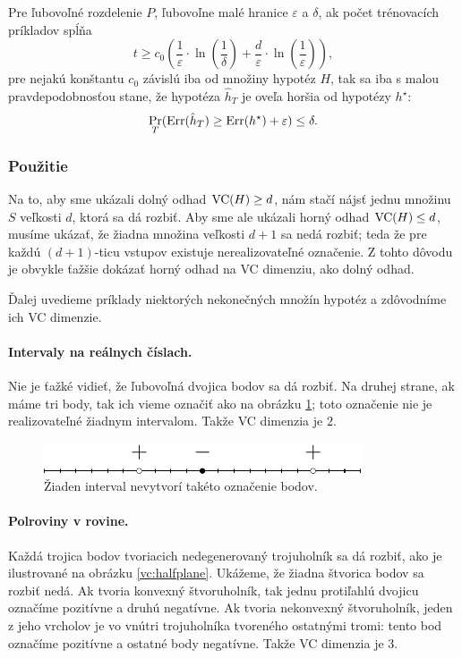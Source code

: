 \begin{theorem}
  Pre ľubovoľné rozdelenie $P$, ľubovoľne malé hranice $\varepsilon$
  a $\delta$, ak počet trénovacích príkladov spĺňa
  $$ t \geq c_0 \left( \frac{1}{\varepsilon} \cdot \ln \left( \frac{1}{\delta} \right) + \frac{d}{\varepsilon} \cdot \ln \left( \frac{1}{\varepsilon} \right) \right), $$
  pre nejakú konštantu $c_0$ závislú iba od množiny hypotéz $H$,
  tak sa iba s malou pravdepodobnosťou stane, že hypotéza $\hat{h}_T$
  je oveľa horšia od hypotézy $h^\star$:
  $$ \operatorname*{\textstyle\mathrm{Pr}}_T( \mathrm{Err}(\hat{h}_T) \geq \mathrm{Err}(h^\star) + \varepsilon ) \leq \delta. $$
\end{theorem}


\subsubsection{Použitie}

Na to, aby sme ukázali dolný odhad $\mathrm{VC}(H) \geq d$, nám stačí nájsť jednu
množinu $S$ veľkosti $d$, ktorá sa dá rozbiť. Aby sme ale ukázali horný
odhad $\mathrm{VC}(H) \leq d$, musíme ukázať, že žiadna množina veľkosti $d + 1$
sa nedá rozbiť; teda že pre každú $(d + 1)$-ticu vstupov existuje
nerealizovateľné označenie. Z tohto dôvodu je obvykle ťažšie dokázať
horný odhad na VC dimenziu, ako dolný odhad.

Ďalej uvedieme príklady niektorých nekonečných množín hypotéz a zdôvodníme
ich VC dimenzie.

\paragraph{Intervaly na reálnych číslach.} Nie je ťažké vidieť, že
ľubovoľná dvojica bodov sa dá rozbiť. Na druhej strane, ak máme tri
body, tak ich vieme označiť ako na obrázku \ref{vc:interval}; toto
označenie nie je realizovateľné žiadnym intervalom. Takže VC dimenzia
je $2$.

\begin{figure}
  \centering
  \includegraphics[scale=1]{obrazky/interval.pdf}
  \caption{Žiaden interval nevytvorí takéto označenie bodov.}
  \label{vc:interval}
\end{figure}

\paragraph{Polroviny v rovine.} Každá trojica bodov tvoriacich
nedegenerovaný trojuholník sa dá rozbiť, ako je ilustrované na
obrázku \ref{vc:halfplane}. Ukážeme, že žiadna štvorica bodov
sa rozbiť nedá. Ak tvoria konvexný štvoruholník, tak jednu protiľahlú 
dvojicu označíme pozitívne a druhú negatívne. Ak tvoria nekonvexný 
štvoruholník, jeden z jeho vrcholov je vo vnútri trojuholníka tvoreného 
ostatnými tromi: tento bod označíme pozitívne a ostatné body negatívne.
Takže VC dimenzia je $3$.

